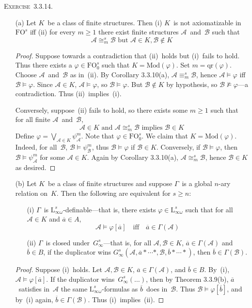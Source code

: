 \documentclass[letterpaper]{article}
\newcommand{\A}{\mathcal{A}}
\newcommand{\B}{\mathcal{B}}
\newcommand{\fo}{\mathrm{FO}}
\renewcommand{\L}{\mathrm{L}}
\newcommand{\Lio}{\L_{\infty\omega}}
\newcommand{\mods}{\mathrm{Mod}}
\newcommand{\obar}[1]{\overline{#1}}
\newcommand{\biglor}{\bigvee}
\newcommand{\iso}{\cong}
\newcommand{\qr}{\mathrm{qr}}
\newcommand{\exercise}[1]{\noindent\textsc{Exercise~{#1}.}}
\theoremstyle{plain}
\begin{document}
\exercise{3.3.14}
\begin{enumerate}
\item[(a)] Let $K$~be a class of finite structures. Then (i) $K$~is not axiomatizable in~$\fo^s$ iff (ii) for every $m\ge1$ there exist finite structures $\A$~and~$\B$ such that
$$\A\iso_m^s\B\text{ but }\A\in K,\B\not\in K$$
\begin{proof}
Suppose towards a contradiction that (ii)~holds but (i)~fails to hold. Thus there exists a $\varphi\in\fo_0^s$ such that $K=\mods(\varphi)$. Set $m=\qr(\varphi)$. Choose $\A$~and~$\B$ as in~(ii). By Corollary 3.3.10(a), $\A\equiv_m^s\B$, hence $\A\models\varphi$ iff $\B\models\varphi$. Since $\A\in K$, $\A\models\varphi$, so $\B\models\varphi$. But $\B\not\in K$ by hypothesis, so $\B\not\models\varphi$---a contradiction. Thus (ii)~implies~(i).

Conversely, suppose~(ii) fails to hold, so there exists some $m\ge1$ such that for all finite $\A$~and~$\B$,
$$\A\in K\text{ and }\A\iso_m^s\B\text{ implies }\B\in K$$
Define $\varphi=\biglor_{\A\in K}\psi_{\A}^m$. Note that $\varphi\in\fo_0^s$. We claim that $K=\mods(\varphi)$. Indeed, for all~$\B$, $\B\models\psi_{\B}^m$, thus $\B\models\varphi$ if $\B\in K$. Conversely, if $\B\models\varphi$, then $\B\models\psi_{\A}^m$ for some $\A\in K$. Again by Corollary 3.3.10(a), $\A\iso_m^s\B$, hence $\B\in K$ as desired.
\end{proof}
\item[(b)] Let $K$~be a class of finite structures and suppose $\Gamma$~is a global $n$-ary relation on~$K$. Then the following are equivalent for $s\ge n$:
\begin{enumerate}
\item[(i)] $\Gamma$~is $\Lio^s$-definable---that is, there exists $\varphi\in\Lio^s$ such that for all $\A\in K$ and $\obar{a}\in A$,
$$\A\models\varphi[\obar{a}]\quad\text{iff}\quad\obar{a}\in\Gamma(\A)$$
\item[(ii)] $\Gamma$~is closed under~$G_{\infty}^s$---that is, for all $\A,\B\in K$, $\obar{a}\in\Gamma(\A)$ and $\obar{b}\in B$, if the duplicator wins $G_{\infty}^s(\A,\obar{a}*\cdots*,\B,\obar{b}*\cdots*)$, then $\obar{b}\in\Gamma(\B)$.
\end{enumerate}
\begin{proof}
Suppose (i)~holds. Let $\A,\B\in K$, $\obar{a}\in\Gamma(\A)$, and $\obar{b}\in B$. By~(i), $\A\models\varphi[\obar{a}]$. If the duplicator wins~$G_{\infty}^s(\ldots)$, then by Theorem 3.3.9(b), $\obar{a}$~satisfies in~$\A$ the same $\Lio^s$-formulas as $\obar{b}$~does in~$\B$. Thus $\B\models\varphi[\obar{b}]$, and by~(i) again, $\obar{b}\in\Gamma(\B)$. Thus (i)~implies~(ii).


\end{proof}
\end{enumerate}
\end{document}
